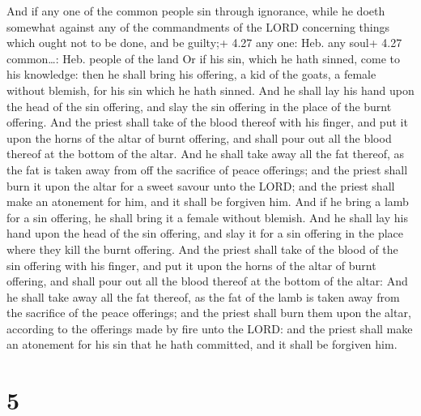  And if any one of the common people sin through
ignorance, while he doeth somewhat against any of the commandments of
the LORD concerning things which ought not to be done, and be guilty;+
4.27 any one: Heb. any soul+ 4.27 common\ldots: Heb. people of the land
 Or if his sin, which he hath sinned, come to his
knowledge: then he shall bring his offering, a kid of the goats, a
female without blemish, for his sin which he hath sinned. 
And he shall lay his hand upon the head of the sin offering, and slay
the sin offering in the place of the burnt offering.  And
the priest shall take of the blood thereof with his finger, and put it
upon the horns of the altar of burnt offering, and shall pour out all
the blood thereof at the bottom of the altar.  And he shall
take away all the fat thereof, as the fat is taken away from off the
sacrifice of peace offerings; and the priest shall burn it upon the
altar for a sweet savour unto the LORD; and the priest shall make an
atonement for him, and it shall be forgiven him.  And if he
bring a lamb for a sin offering, he shall bring it a female without
blemish.  And he shall lay his hand upon the head of the
sin offering, and slay it for a sin offering in the place where they
kill the burnt offering.  And the priest shall take of the
blood of the sin offering with his finger, and put it upon the horns of
the altar of burnt offering, and shall pour out all the blood thereof at
the bottom of the altar:  And he shall take away all the
fat thereof, as the fat of the lamb is taken away from the sacrifice of
the peace offerings; and the priest shall burn them upon the altar,
according to the offerings made by fire unto the LORD: and the priest
shall make an atonement for his sin that he hath committed, and it shall
be forgiven him.

\hypertarget{section-4}{%
\section{5}\label{section-4}}

